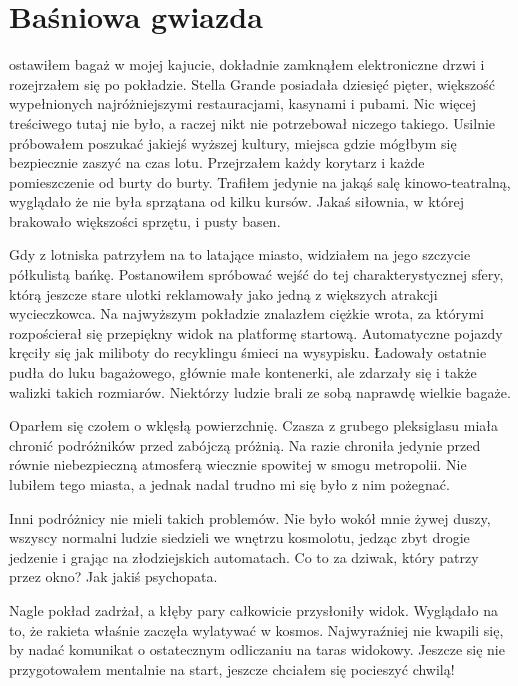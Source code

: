 \chapter{Baśniowa gwiazda} 


ostawiłem bagaż w mojej kajucie, dokładnie zamknąłem elektroniczne drzwi i rozejrzałem się po pokładzie.
Stella Grande posiadała dziesięć pięter, większość wypełnionych najróżniejszymi restauracjami, kasynami i pubami.
Nic więcej treściwego tutaj nie było, a raczej nikt nie potrzebował niczego takiego.
Usilnie próbowałem poszukać jakiejś wyższej kultury, miejsca gdzie mógłbym się bezpiecznie zaszyć na czas lotu.
Przejrzałem każdy korytarz i każde pomieszczenie od burty do burty.
Trafiłem jedynie na jakąś salę kinowo-teatralną, wyglądało że nie była sprzątana od kilku kursów.
Jakaś siłownia, w której brakowało większości sprzętu, i pusty basen.

Gdy z lotniska patrzyłem na to latające miasto, widziałem na jego szczycie półkulistą bańkę.
Postanowiłem spróbować wejść do tej charakterystycznej sfery, którą jeszcze stare ulotki reklamowały jako jedną z większych atrakcji wycieczkowca.
Na najwyższym pokładzie znalazłem ciężkie wrota, za którymi rozpościerał się przepiękny widok na platformę startową.
Automatyczne pojazdy kręciły się jak miliboty do recyklingu śmieci na wysypisku.
Ładowały ostatnie pudła do luku bagażowego, głównie małe kontenerki, ale zdarzały się i także walizki takich rozmiarów.
Niektórzy ludzie brali ze sobą naprawdę wielkie bagaże.

Oparłem się czołem o wklęsłą powierzchnię.
Czasza z grubego pleksiglasu miała chronić podróżników przed zabójczą próżnią.
Na razie chroniła jedynie przed równie niebezpieczną atmosferą wiecznie spowitej w smogu metropolii.
Nie lubiłem tego miasta, a jednak nadal trudno mi się było z nim pożegnać.

Inni podróżnicy nie mieli takich problemów.
Nie było wokół mnie żywej duszy, wszyscy normalni ludzie siedzieli we wnętrzu kosmolotu, jedząc zbyt drogie jedzenie i grając na złodziejskich automatach.
Co to za dziwak, który patrzy przez okno? Jak jakiś psychopata.

Nagle pokład zadrżał, a kłęby pary całkowicie przysłoniły widok.
Wyglądało na to, że rakieta właśnie zaczęła wylatywać w kosmos.
Najwyraźniej nie kwapili się, by nadać komunikat o ostatecznym odliczaniu na taras widokowy.
Jeszcze się nie przygotowałem mentalnie na start, jeszcze chciałem się pocieszyć chwilą!

